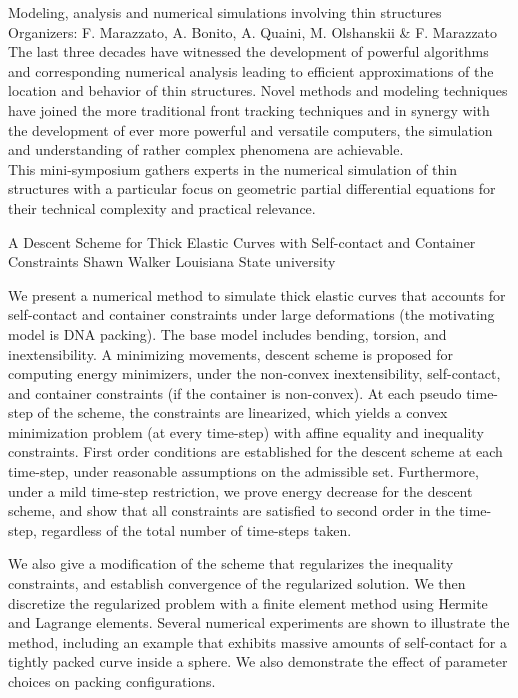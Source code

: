 \label{mini04}

\miniabs
{Modeling, analysis and numerical simulations involving thin structures}
{Organizers: F. Marazzato, A. Bonito, A. Quaini, M. Olshanskii \& F. Marazzato}
{The last three decades have witnessed the development of powerful algorithms and corresponding numerical analysis leading to efficient approximations of the location and behavior of thin structures. Novel methods and modeling techniques have joined the more traditional front tracking techniques and in synergy with the development of ever more powerful and versatile computers, the simulation and understanding of rather complex phenomena are achievable.\\
This mini-symposium gathers experts in the numerical simulation of thin structures with a particular focus on geometric partial differential equations for their technical complexity and practical relevance.}

\vspace{2ex}
\abs
{A Descent Scheme for Thick Elastic Curves with Self-contact and Container Constraints}
{Shawn Walker}
{Louisiana State university}
{We present a numerical method to simulate thick elastic curves that accounts for self-contact and container constraints under large deformations (the motivating model is DNA packing). The base model includes bending, torsion, and inextensibility. A minimizing movements, descent scheme is proposed for computing energy minimizers, under the non-convex inextensibility, self-contact, and container constraints (if the container is non-convex). At each pseudo time-step of the scheme, the constraints are linearized, which yields a convex minimization problem (at every time-step) with affine equality and inequality constraints. First order conditions are established for the descent scheme at each time-step, under reasonable assumptions on the admissible set. Furthermore, under a mild time-step restriction, we prove energy decrease for the descent scheme, and show that all constraints are satisfied to second order in the time-step, regardless of the total number of time-steps taken.

We also give a modification of the scheme that regularizes the inequality constraints, and establish convergence of the regularized solution. We then discretize the regularized problem with a finite element method using Hermite and Lagrange elements. Several numerical experiments are shown to illustrate the method, including an example that exhibits massive amounts of self-contact for a tightly packed curve inside a sphere.  We also demonstrate the effect of parameter choices on packing configurations.
}


